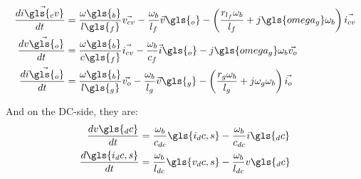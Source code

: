 \begin{align}
 \frac{d \Vec{i\gls{_cv}}}{dt} &= \frac{\omega\gls{_b}}{l\gls{_f}}\Vec{v_{cv}} - \frac{\omega_b}{l_f}\Vec{v}\gls{_o} - \left( \frac{r_{l_f}\omega_b}{l_f} + j\gls{omega_g}\omega_b \right) \Vec{i_{cv}}\\
 \frac{d \Vec{v\gls{_o}}}{dt} &= \frac{\omega\gls{_b}}{c\gls{_f}}\Vec{i_{cv}} - \frac{\omega_b}{c_f}\Vec{i}\gls{_o} - j\gls{omega_g}\omega_b \Vec{v_{o}}\\
 \frac{d \Vec{i\gls{_o}}}{dt} &= \frac{\omega\gls{_b}}{l\gls{_g}}\Vec{v_{o}} - \frac{\omega_b}{l_g}\Vec{v}\gls{_g} - \left( \frac{r_{g}\omega_b}{l_g} + j\omega_g\omega_b \right) \Vec{i_{o}}\\
\end{align}{}



And on the DC-side, they are:
\begin{align}
 \frac{d v\gls{_dc}}{dt} &= \frac{\omega_b}{c_{dc}}\gls{i_dc,s} - \frac{\omega_b}{c_{dc}}i\gls{_dc}\\
 \frac{d \gls{i_dc,s}}{dt} &= \frac{\omega_b}{l_{dc}}\gls{v_dc,s} - \frac{\omega_b}{l_{dc}}v\gls{_dc}
\end{align}{}